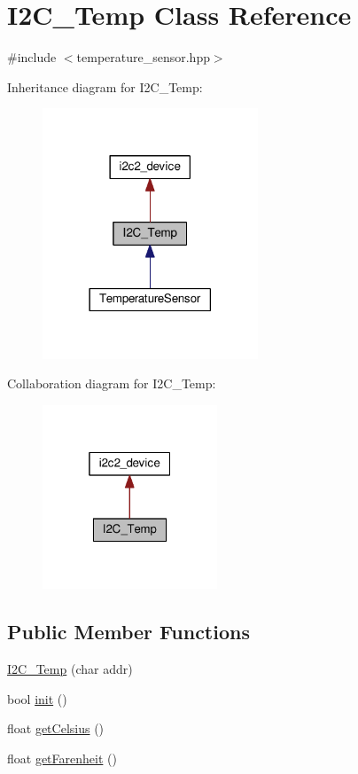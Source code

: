 \hypertarget{classI2C__Temp}{}\section{I2\+C\+\_\+\+Temp Class Reference}
\label{classI2C__Temp}


{\ttfamily \#include $<$temperature\+\_\+sensor.\+hpp$>$}



Inheritance diagram for I2\+C\+\_\+\+Temp\+:\nopagebreak
\begin{figure}[H]
\begin{center}
\leavevmode
\includegraphics[width=182pt]{d0/de8/classI2C__Temp__inherit__graph}
\end{center}
\end{figure}


Collaboration diagram for I2\+C\+\_\+\+Temp\+:\nopagebreak
\begin{figure}[H]
\begin{center}
\leavevmode
\includegraphics[width=148pt]{dc/d69/classI2C__Temp__coll__graph}
\end{center}
\end{figure}
\subsection*{Public Member Functions}
\begin{DoxyCompactItemize}
\item 
\hyperlink{classI2C__Temp_aa7ee672d00b61ac4fa179fe06713ef30}{I2\+C\+\_\+\+Temp} (char addr)
\item 
bool \hyperlink{classI2C__Temp_a01532ca98009a358ebb4f5e507abce3e}{init} ()
\item 
float \hyperlink{classI2C__Temp_a8d385257d5d46ad95358616abb614243}{get\+Celsius} ()
\item 
float \hyperlink{classI2C__Temp_a573d8814e1ee2201c88aa11d6974c27e}{get\+Farenheit} ()
\end{DoxyCompactItemize}
